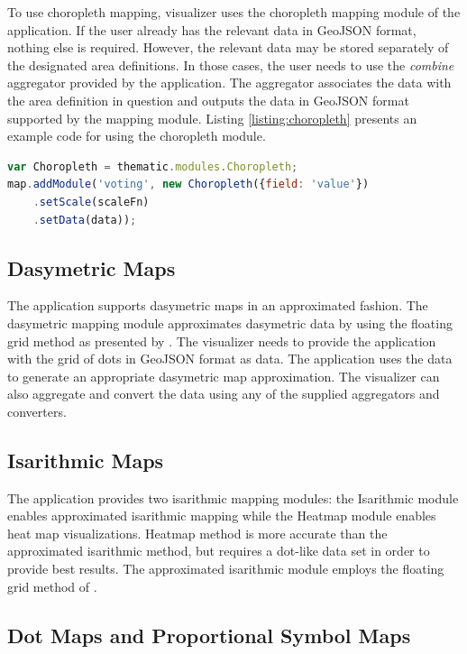 To use choropleth mapping, visualizer uses the choropleth mapping module of the application. If the user already has the relevant data in GeoJSON format, nothing else is required. However, the relevant data may be stored separately of the designated area definitions. In those cases, the user needs to use the \emph{combine} aggregator provided by the application. The aggregator associates the data with the area definition in question and outputs the data in GeoJSON format supported by the mapping module. Listing \ref{listing:choropleth} presents an example code for using the choropleth module.

\begin{lstlisting}[caption=Using the choropleth mapping module with Thematic.js.,language=JavaScript,label=listing:choropleth]
var Choropleth = thematic.modules.Choropleth;
map.addModule('voting', new Choropleth({field: 'value'})
    .setScale(scaleFn)
    .setData(data));
\end{lstlisting}

\subsection{Dasymetric Maps}

The application supports dasymetric maps in an approximated fashion. The dasymetric mapping module approximates dasymetric data by using the floating grid method as presented by \citet{langford_generating_1994}. The visualizer needs to provide the application with the grid of dots in GeoJSON format as data. The application uses the data to generate an appropriate dasymetric map approximation. The visualizer can also aggregate and convert the data using any of the supplied aggregators and converters.

\subsection{Isarithmic Maps}

The application provides two isarithmic mapping modules: the Isarithmic module enables approximated isarithmic mapping while the Heatmap module enables heat map visualizations. Heatmap method is more accurate than the approximated isarithmic method, but requires a dot-like data set in order to provide best results. The approximated isarithmic module employs the floating grid method of \citet{langford_generating_1994}.

\subsection{Dot Maps and Proportional Symbol Maps}

